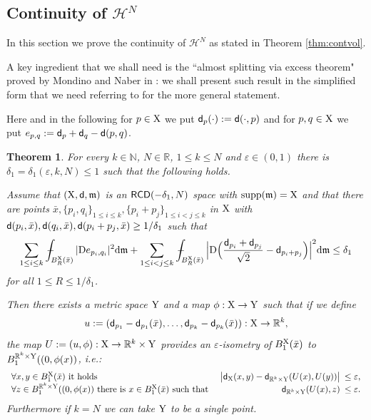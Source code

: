 \documentclass[reqno,11pt]{article}
\numberwithin{equation}{section}
\newcommand{\N}{\mathbb{N}}
\newcommand{\R}{\mathbb{R}}
\newcommand{\mm}{{\mbox{\boldmath$m$}}}
\newcommand{\sfd}{{\sf d}}
\newcommand{\supp}{\mathop{\rm supp}\nolimits}   %
\renewcommand{\d}{{\mathrm d}}
\newcommand{\eps}{\varepsilon}
\newcommand{\mean}[1]{\,-\hskip-1.08em\int_{#1}} %
\renewcommand{\mm}{\mathfrak m}                                %
\newtheorem{theorem}{Theorem}[section]
\newcommand{\X}{{\rm X}}
\newcommand{\Y}{{\rm Y}}
\newcommand{\RCD}{{\sf RCD}}
\newcommand{\D}{{\rm D}}
\newcommand{\HH}{{\mathcal H}}
\begin{document}
\subsection{Continuity of $\HH^N$}\label{se:contvol}
In this section we prove the continuity of $\HH^N$ as stated in Theorem \ref{thm:contvol}. 



 A key ingredient that we shall need is the ``almost splitting via excess theorem" proved  by Mondino and Naber in \cite[Theorem 5.1]{Mondino-Naber14}: we shall present such result in the simplified form that we need referring to \cite{Mondino-Naber14} for the more general statement.

Here and in the following for $p\in\X$ we put $\sfd_p(\cdot):=\sfd(\cdot,p)$ and for $p,q\in\X$ we put $e_{p,q}:=\sfd_p+\sfd_q-\sfd(p,q)$.
\begin{theorem}\label{thm:MN11} For every  $k\in \N$, \(N\in \R\), $1\le k\le N$ and   \(\varepsilon\in (0,1)\) there is  \(\delta_1=\delta_1(\varepsilon,k,N)\leq 1\) such that the following holds. 

Assume that  $(\X,\sfd,\mm)$ is an $\RCD(-\delta_1 ,N)$ space with $\supp(\mm)=\X$ and that there are points  \(\bar x ,\{p_i, q_i\}_{1\le i\le k}, \{p_i+p_j\}_{1\le i<j\le k}\) in $\X$ with \(\sfd(p_i,\bar x), \sfd(q_i,\bar x), \sfd(p_i+p_j,\bar x)\ge 1/\delta_1\) such that
\begin{equation}\label{eq:quasi} 
\sum_{1\le i\le k} \mean{B^\X_{R}(\bar x)} | \D e_{p_i,q_i} |^2\d \mm+\sum_{1\le i<j\le k} \mean {B^\X_{R}(\bar x)}\Big| \D\Big(\frac{\sfd_{p_i}+\sfd_{p_j}}{\sqrt 2}-\sfd_{p_i+p_j}\Big)\Big|^2\d \mm\le \delta_1
\end{equation} 
for all \(1\le R\le 1/\delta_1\). { 

Then  there exists a metric space \(\Y\) and a map \(\phi: \X\to \Y\)  such that if we define 
\[
u:=(\sfd_{p_1}-\sfd_{p_1}(\bar x ),\dots, \sfd_{p_k}-\sfd_{p_k}(\bar x)): \X\to\R^k, 
\]
the map \(U:=(u,\phi): \X\to \R^k\times \Y\)  provides an $\eps$-isometry of $B_1^{\X}(\bar x)$ to $B_1^{\R^k\times \Y}((0,\phi(x))$, i.e.:
\[
\begin{array}{lrr}
\forall x,y\in B_1^\X(\bar x)\text{ it holds }&\big|\sfd_{\X}(x,y)-\sfd_{\R^k\times \Y}(U(x),U(y))\big|&\!\!\!\leq \eps,\\
\forall z\in B_1^{\R^k\times \Y}((0,\phi(x))\text{ there is $x\in B_1^{\X}(\bar x)$ such that } &\sfd_{\R^k\times \Y}(U(x),z)&\!\!\!\leq\eps.
\end{array}
\]
Furthermore if \(k=N\) we can take \(\Y\) to be a single point.
}
\end{theorem}
\end{document}
